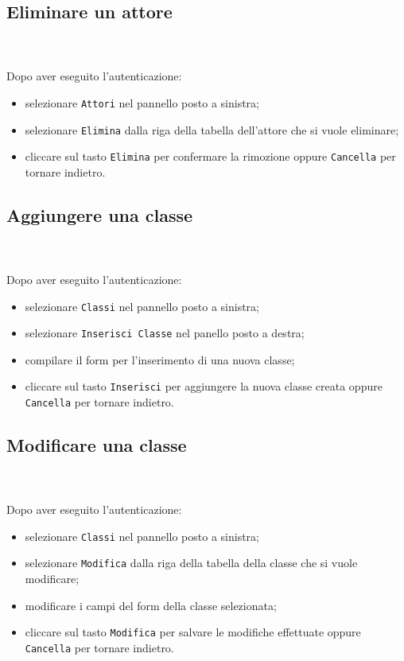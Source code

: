 	\subsection{Eliminare un attore} \mbox{}\\ \mbox{}\\
	Dopo aver eseguito l'autenticazione:
	\begin{itemize}
		\item selezionare \texttt{Attori} nel pannello posto a sinistra;
		\item selezionare \texttt{Elimina} dalla riga della tabella dell'attore
		che si vuole eliminare;
		\item cliccare sul tasto \texttt{Elimina} per confermare la rimozione
		oppure \texttt{Cancella} per tornare indietro.	
	\end{itemize}
	
	\subsection{Aggiungere una classe} \mbox{}\\ \mbox{}\\
	Dopo aver eseguito l'autenticazione:
	\begin{itemize}
		\item selezionare \texttt{Classi} nel pannello posto a sinistra;
		\item selezionare \texttt{Inserisci Classe} nel panello posto a destra;
		\item compilare il form per l'inserimento di una nuova classe;
		\item cliccare sul tasto \texttt{Inserisci} per aggiungere la nuova 
		classe 
		creata oppure \texttt{Cancella} per tornare indietro.	
	\end{itemize}
	
	\subsection{Modificare una classe} \mbox{}\\ \mbox{}\\
	Dopo aver eseguito l'autenticazione:
	\begin{itemize}
		\item selezionare \texttt{Classi} nel pannello posto a sinistra;
		\item selezionare \texttt{Modifica} dalla riga della tabella della 
		classe
		che si vuole modificare;
		\item modificare i campi del form della classe selezionata;
		\item cliccare sul tasto \texttt{Modifica} per salvare le modifiche 
		effettuate
		oppure \texttt{Cancella} per tornare indietro.
	\end{itemize}
	
